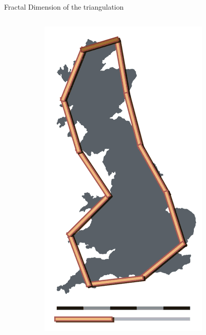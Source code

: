 \begin{frame}{Fractal Dimension of the triangulation}
 \begin{columns}
  \begin{column}{0.38\textwidth}
   \begin{figure}
    \centering
    \begin{subfigure}{0.32\textwidth}
     \includegraphics[width=\textwidth]{pics/Britain-fractal-coastline-200km}

\end{subfigure}
\end{figure}
\end{column}
\end{columns}
\end{frame}
